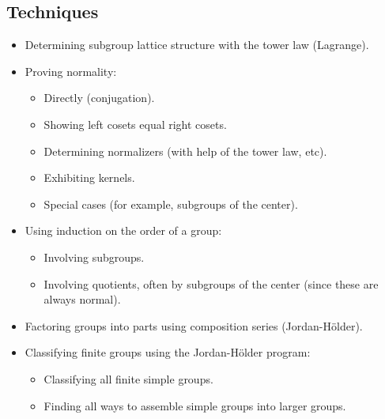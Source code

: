\subsection*{Techniques}
\begin{itemize}[itemsep=0pt]
\item Determining subgroup lattice structure with the tower law (Lagrange).
\item Proving normality:
\begin{itemize}[itemsep=0pt]
\item Directly (conjugation).
\item Showing left cosets equal right cosets.
\item Determining normalizers (with help of the tower law, etc).
\item Exhibiting kernels.
\item Special cases (for example, subgroups of the center).
\end{itemize}
\item Using induction on the order of a group:
\begin{itemize}[itemsep=0pt]
\item Involving subgroups.
\item Involving quotients, often by subgroups of the center (since these are always normal).
\end{itemize}
\item Factoring groups into parts using composition series (Jordan-H\"older).
\item Classifying finite groups using the Jordan-H\"older program:
\begin{itemize}[itemsep=0pt]
\item Classifying all finite simple groups.
\item Finding all ways to assemble simple groups into larger groups.
\end{itemize}
\end{itemize}
